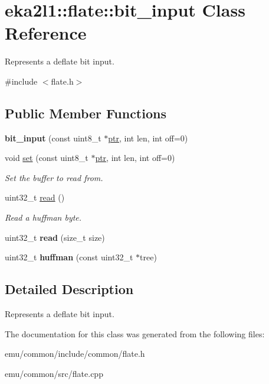 \hypertarget{classeka2l1_1_1flate_1_1bit__input}{}\section{eka2l1\+:\+:flate\+:\+:bit\+\_\+input Class Reference}
\label{classeka2l1_1_1flate_1_1bit__input}


Represents a deflate bit input.  




{\ttfamily \#include $<$flate.\+h$>$}

\subsection*{Public Member Functions}
\begin{DoxyCompactItemize}
\item 
\mbox{\label{classeka2l1_1_1flate_1_1bit__input_aa9dbb50c1b40a6fbc1e88f52caae155a}} 
{\bfseries bit\+\_\+input} (const uint8\+\_\+t $\ast$\mbox{\hyperlink{classeka2l1_1_1ptr}{ptr}}, int len, int off=0)
\item 
\mbox{\label{classeka2l1_1_1flate_1_1bit__input_af5c61079fac7cafd0ec27c28bd3f78f9}} 
void \mbox{\hyperlink{classeka2l1_1_1flate_1_1bit__input_af5c61079fac7cafd0ec27c28bd3f78f9}{set}} (const uint8\+\_\+t $\ast$\mbox{\hyperlink{classeka2l1_1_1ptr}{ptr}}, int len, int off=0)
\begin{DoxyCompactList}\small\item\em Set the buffer to read from. \end{DoxyCompactList}\item 
\mbox{\label{classeka2l1_1_1flate_1_1bit__input_aa2baced757eb2df2a6f043ea8e747bc9}} 
uint32\+\_\+t \mbox{\hyperlink{classeka2l1_1_1flate_1_1bit__input_aa2baced757eb2df2a6f043ea8e747bc9}{read}} ()
\begin{DoxyCompactList}\small\item\em Read a huffman byte. \end{DoxyCompactList}\item 
\mbox{\label{classeka2l1_1_1flate_1_1bit__input_a19b2d11568be994276947fe28334210b}} 
uint32\+\_\+t {\bfseries read} (size\+\_\+t size)
\item 
\mbox{\label{classeka2l1_1_1flate_1_1bit__input_a1c6cc03c59f0929aa0be7cbbb964392c}} 
uint32\+\_\+t {\bfseries huffman} (const uint32\+\_\+t $\ast$tree)
\end{DoxyCompactItemize}


\subsection{Detailed Description}
Represents a deflate bit input. 

The documentation for this class was generated from the following files\+:\begin{DoxyCompactItemize}
\item 
emu/common/include/common/flate.\+h\item 
emu/common/src/flate.\+cpp\end{DoxyCompactItemize}
